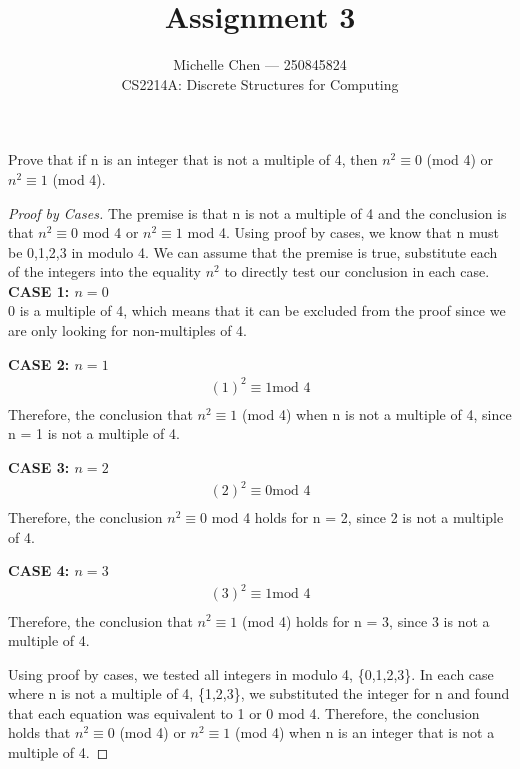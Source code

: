 \documentclass[12pt]{article}
\newenvironment{exercise}[2][Exercise]{\begin{trivlist}
\item[\hskip \labelsep {\bfseries #1}\hskip \labelsep {\bfseries #2.}]}{\end{trivlist}}
\begin{document}
 
 
 
\title{Assignment 3}%
\author{Michelle Chen --- 250845824\\ %
CS2214A: Discrete Structures for Computing} %
 
\maketitle
 
\begin{exercise}{1} %
Prove that if n is an integer that is not a multiple of 4, then $n^2 \equiv 0$ (mod 4) or $n^2 ≡ 1$ (mod 4).
\end{exercise}
 
\begin{proof}[Proof by Cases]
The premise is that n is not a multiple of 4 and the conclusion is that $n^2 \equiv 0$ mod 4 or $n^2 \equiv 1$ mod 4. Using proof by cases, we know that n must be {0,1,2,3} in modulo 4. We can assume that the premise is true, substitute each of the integers into the equality $n^2$ to directly test our conclusion in each case. \\

\textbf{CASE 1: $n = 0$\\}
0 is a multiple of 4, which means that it can be excluded from the proof since we are only looking for non-multiples of 4.

\textbf{CASE 2: $n = 1$}
\begin{align*}
(1)^2 \equiv 1 \text{mod 4} \\
\end{align*}
Therefore, the conclusion that $n^2 ≡ 1$ (mod 4) when n is not a multiple of 4, since n = 1 is not a multiple of 4. 

\textbf{CASE 3: $n = 2$}
\begin{align*}
(2)^2 \equiv 0 \text{mod 4} \\
\end{align*}
Therefore, the conclusion $n^2 \equiv 0$ mod 4 holds for n = 2, since 2 is not a multiple of 4.

\textbf{CASE 4: $n = 3$}
\begin{align*}
(3)^2 \equiv 1 \text{mod 4} \\
\end{align*}
Therefore, the conclusion that $n^2 \equiv 1$ (mod 4) holds for n = 3, since 3 is not a multiple of 4.

Using proof by cases, we tested all integers in modulo 4, \{0,1,2,3\}. In each case where n is not a multiple of 4, \{1,2,3\}, we substituted the integer for n and found that each equation was equivalent to 1 or 0 mod 4. Therefore, the conclusion holds that $n^2 \equiv 0$ (mod 4) or $n^2 \equiv 1$ (mod 4) when n is an integer that is not a multiple of 4.
\end{proof}
\end{document}
